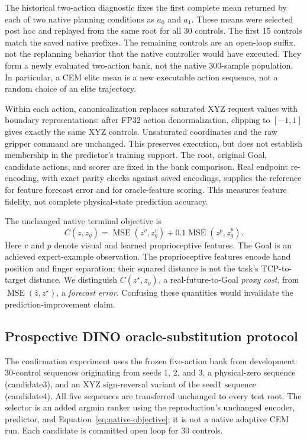 \documentclass[11pt]{article}
\begin{document}
The historical two-action diagnostic fixes the first complete mean returned by each of
two native planning conditions as $a_0$ and $a_1$. These means were selected
post hoc and replayed from the same root for all 30 controls. The first 15
controls match the saved native prefixes. The remaining controls are an
open-loop suffix, not the replanning behavior that the native controller would
have executed. They form a newly evaluated two-action bank, not the native
300-sample population. In particular, a CEM elite mean is a new executable
action sequence, not a random choice of an elite trajectory.

Within each action, canonicalization replaces saturated XYZ request values
with boundary representations: after FP32 action denormalization, clipping
to $[-1,1]$ gives exactly the same XYZ controls. Unsaturated coordinates and
the raw gripper command are unchanged. This preserves execution, but does not
establish membership in the predictor's training support. The root, original Goal,
candidate actions, and scorer are fixed in the bank comparison. Real endpoint
re-encoding, with exact parity checks against saved encodings, supplies
the reference for feature forecast
error and for oracle-feature scoring. This measures feature fidelity, not
complete physical-state prediction accuracy.

The unchanged native terminal objective is
\begin{equation}
 C(z,z_g)=\operatorname{MSE}(z^{v},z_g^{v})
          +0.1\operatorname{MSE}(z^{p},z_g^{p}).
 \label{eq:native-objective}
\end{equation}
Here $v$ and $p$ denote visual and learned proprioceptive features. The Goal
is an achieved expert-example observation. The proprioceptive features encode
hand position and finger separation; their squared distance is not the task's
TCP-to-target distance. We distinguish $C(z^\star,z_g)$, a real-future-to-Goal
\emph{proxy cost}, from $\operatorname{MSE}(\hat z,z^\star)$, a
\emph{forecast error}. Confusing these quantities would invalidate the
prediction-improvement claim.

\subsection{Prospective DINO oracle-substitution protocol}
\label{sec:prospective-protocol}
The confirmation experiment uses the frozen five-action bank from development:
30-control sequences originating from seeds 1, 2, and 3, a physical-zero
sequence (candidate3), and an XYZ sign-reversal variant of the seed1 sequence
(candidate4). All five sequences are transferred unchanged to every test root.
The selector is an added argmin ranker using the reproduction's unchanged
encoder, predictor, and Equation~\ref{eq:native-objective}; it is not a native
adaptive CEM run. Each candidate is committed open loop for 30 controls.
\end{document}
